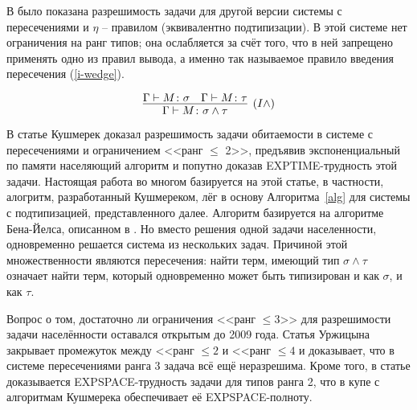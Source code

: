 \documentclass[../main.tex]{subfiles}
\begin{document}
В \cite{kurata_1995} было показана разрешимость задачи для другой версии системы с пересечениями и $\eta$ -- правилом (эквивалентно подтипизации). В этой системе нет ограничения на ранг типов; она ослабляется за счёт того, что в ней запрещено применять одно из правил вывода, а именно так называемое правило введения пересечения (\ref{i-wedge}). 

\begin{equation} \label{i-wedge}
\infer[(I\wedge)]{\Gamma \vdash M \colon \sigma \wedge \tau}{\Gamma \vdash M \colon \sigma & \Gamma \vdash M \colon \tau}
\end{equation}

В статье \cite{kusmierek_2007} Кушмерек доказал разрешимость задачи обитаемости в системе с пересечениями и ограничением <<ранг $\leqslant$ 2>>, предъявив экспоненциальный по памяти населяющий алгоритм и попутно доказав EXPTIME-трудность этой задачи. Настоящая работа во многом базируется на этой статье, в частности, алогритм, разработанный Кушмереком, лёг в основу Алгоритма~\ref{alg} для системы с подтипизацией, представленного далее. Алгоритм базируется на алгоритме Бена-Йелса, описанном в \cite{hindley_2008}. Но вместо решения одной задачи населенности, одновременно решается система из нескольких задач. Причиной этой множественности являются пересечения: найти терм, имеющий тип $\sigma \wedge \tau$ означает найти терм, который одновременно может быть типизирован и как $\sigma$, и как $\tau$. 

Вопрос о том, достаточно ли ограничения <<ранг $\leqslant 3$>> для разрешимости задачи населённости оставался открытым до 2009 года. Статья Уржицына\cite{urzyczyn_2009} закрывает промежуток между <<ранг $\leqslant 2$ и <<ранг $\leqslant 4$ и доказывает, что в системе пересечениями ранга $3$ задача всё ещё неразрешима. Кроме того, в статье доказывается EXPSPACE-трудность задачи для типов ранга 2, что в купе с алгоритмам Кушмерека обеспечивает её EXPSPACE-полноту.








\end{document}
